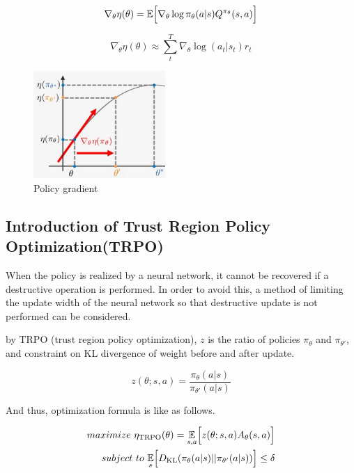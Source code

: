 \[
\nabla_\theta \eta(\theta)=\mathbb{E}\Bigl[ \nabla_\theta \log \pi_\theta(a|s) Q^{\pi_\theta}(s,a)   \Bigr]
\]

\[
\nabla_\theta \eta(\theta) \approx \sum_{t}^{T} \nabla_\theta \log (a_t|s_t)r_t
\]



\begin{figure}[H]
\begin{center}
\includegraphics[width=5cm]{./figures/example_policy_gradient.png}
\caption{Policy gradient}
\label{fig:example_gridworld}
\end{center}
\end{figure}


\subsection{Introduction of Trust Region Policy Optimization(TRPO)}

When the policy is realized by a neural network, it cannot be recovered if a destructive operation is performed.
In order to avoid this, a method of limiting the update width of the neural network so that destructive update is not performed can be considered.

by TRPO (trust region policy optimization), $z$ is the ratio of policies $\pi_\theta$ and $\pi_{\theta'}$, and constraint on KL divergence of weight before and after update.

\[
z(\theta;s,a) = \frac{\pi_{\theta}(a|s)}{\pi_{\theta'}(a|s)}
\]

And thus, optimization formula is like as follows.

\begin{eqnarray}
maximize ~\eta_{\mathrm{TRPO}}(\theta) = \underset{s,a}{\mathbb{E}}\Bigl[  z(\theta;s,a)A_{\theta}(s,a) \Bigr] \\
subject ~to~  \underset{s}{\mathbb{E}}\Bigl[ D_{\mathrm{KL}}(\pi_{\theta}(a|s)||\pi_{\theta'}(a|s)) \Bigr]  \leq \delta
\end{eqnarray}


